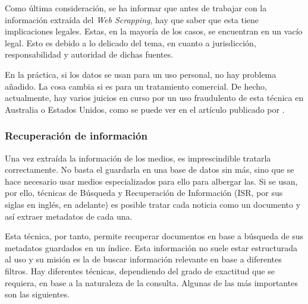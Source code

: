 Como última consideración, se ha informar que antes de trabajar con la información extraída del \textit{Web Scrapping}, hay que saber que esta tiene implicaciones legales. Estas, en la mayoría de los casos, se encuentran en un vacío legal. Esto es debido a lo delicado del tema, en cuanto a jurisdicción, responsabilidad y autoridad de dichas fuentes.

En la práctica, si los datos se usan para un uso personal, no hay problema añadido. La cosa cambia si es para un tratamiento comercial. De hecho, actualmente, hay varios juicios en curso por un uso fraudulento de esta técnica en Australia o Estados Unidos, como se puede ver en el artículo publicado por .

\subsubsection{Recuperación de información}
Una vez extraída la información de los medios, es imprescindible tratarla correctamente. No basta el guardarla en una base de datos sin más, sino que se hace necesario usar medios especializados para ello para albergar las. Si se usan, por ello, técnicas de Búsqueda y Recuperación de Información (ISR, por sus siglas en inglés, en adelante) es posible tratar cada noticia como un documento y así extraer metadatos de cada una.


Esta técnica, por tanto, permite recuperar documentos en base a búsqueda de sus metadatos guardados en un índice. Esta información no suele estar estructurada al uso y su misión es la de buscar información relevante en base a diferentes filtros. Hay diferentes técnicas, dependiendo del grado de exactitud que se requiera, en base a la naturaleza de la consulta. Algunas de las más importantes son las siguientes.

